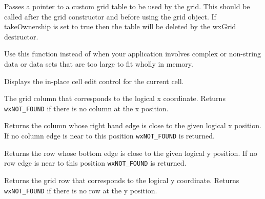 \label{wxgridsettable}


Passes a pointer to a custom grid table to be used by the grid. This should be called
after the grid constructor and before using the grid object. If takeOwnership is set to
true then the table will be deleted by the wxGrid destructor.

Use this function instead of  when your
application involves complex or non-string data or data sets that are too large to fit
wholly in memory.



\label{wxgridshowcelleditcontrol}


Displays the in-place cell edit control for the current cell.



\label{wxgridxtocol}



The grid column that corresponds to the logical x coordinate. Returns
{\tt wxNOT\_FOUND} if there is no column at the x position.



\label{wxgridxtoedgeofcol}


Returns the column whose right hand edge is close to the given logical x position.
If no column edge is near to this position {\tt wxNOT\_FOUND} is returned.



\label{wxgridytoedgeofrow}


Returns the row whose bottom edge is close to the given logical y position.
If no row edge is near to this position {\tt wxNOT\_FOUND} is returned.



\label{wxgridytorow}


Returns the grid row that corresponds to the logical y coordinate. Returns
{\tt wxNOT\_FOUND} if there is no row at the y position.

